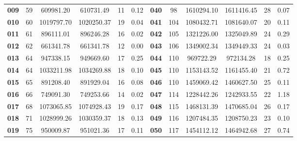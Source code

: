 \begin{table}[htbp]
{\begin{tabular}{cccccc!{\vrule width \lightrulewidth}cccccc}
    \textbf{009} & 59         & 609981.20         & 610731.49        & 11                & 0.12         & \textbf{040} & 98         & 1610294.10       & 1611416.45      & 28               & 0.07          \\
    \textbf{010} & 60         & 1019797.70         & 1020250.37        & 19                & 0.04         & \textbf{041} & 104         & 1080432.71       & 1081640.07      & 20               & 0.11          \\
    \textbf{011} & 61         & 896111.01         & 896246.28        & 16                & 0.02         & \textbf{042} & 105         & 1321226.00       & 1325049.89      & 24               & 0.29          \\
    \textbf{012} & 62         & 661341.78         & 661341.78        & 12                & 0.00         & \textbf{043} & 106         & 1349002.34       & 1349449.33      & 24               & 0.03          \\
    \textbf{013} & 64         & 947338.15         & 949669.60        & 17                & 0.25         & \textbf{044} & 110         & 969722.29       & 972134.28      & 18               & 0.25          \\
    \textbf{014} & 64         & 1033211.98         & 1034269.88        & 18                & 0.10         & \textbf{045} & 110         & 1153143.52       & 1161455.40      & 21               & 0.72          \\
    \textbf{015} & 65         & 891208.40         & 891929.04        & 16                & 0.08         & \textbf{046} & 110         & 1459069.42       & 1460627.50      & 25               & 0.11          \\
    \textbf{016} & 66         & 749091.30         & 749253.66        & 14                & 0.02         & \textbf{047} & 114         & 1228442.26       & 1242933.55      & 22               & 1.18          \\
    \textbf{017} & 68         & 1073065.85         & 1074928.43        & 19                & 0.17         & \textbf{048} & 115         & 1468131.39       & 1470685.04      & 26               & 0.17          \\
    \textbf{018} & 71         & 1028999.26         & 1030359.37        & 18                & 0.13         & \textbf{049} & 116         & 1207484.35       & 1208750.23      & 23               & 0.10          \\
    \textbf{019} & 75         & 950009.87         & 951021.36        & 17                & 0.11         & \textbf{050} & 117         & 1454112.12       & 1464942.68      & 27               & 0.74          \\

\end{tabular}}
\end{table}
